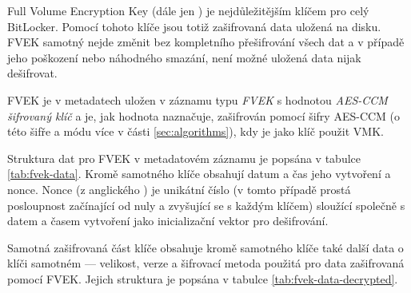 
Full Volume Encryption Key (dále jen ) je nejdůležitějším klíčem pro celý BitLocker. Pomocí tohoto klíče jsou totiž zašifrovaná data uložená na disku. FVEK samotný nejde změnit bez kompletního přešifrování všech dat a v případě jeho poškození nebo náhodného smazání, není možné uložená data nijak dešifrovat.

FVEK je v metadatech uložen v záznamu typu \emph{FVEK} s hodnotou \emph{AES-CCM šifrovaný klíč} a je, jak hodnota naznačuje, zašifrován pomocí šifry AES-CCM (o této šifře a módu více v části \ref{sec:algorithms}), kdy je jako klíč použit VMK.


Struktura dat pro FVEK v metadatovém záznamu je popsána v tabulce \ref{tab:fvek-data}. Kromě samotného klíče obsahují datum a čas jeho vytvoření a nonce. Nonce (z anglického ) je unikátní číslo (v tomto případě prostá posloupnost začínající od nuly a zvyšující se s každým klíčem) sloužící společně s datem a časem vytvoření jako inicializační vektor pro dešifrování\cite{Kohnoc2010}.

Samotná zašifrovaná část klíče obsahuje kromě samotného klíče také další data o klíči samotném --- velikost, verze a šifrovací metoda použitá pro data zašifrovaná pomocí FVEK. Jejich struktura je popsána v tabulce \ref{tab:fvek-data-decrypted}.



